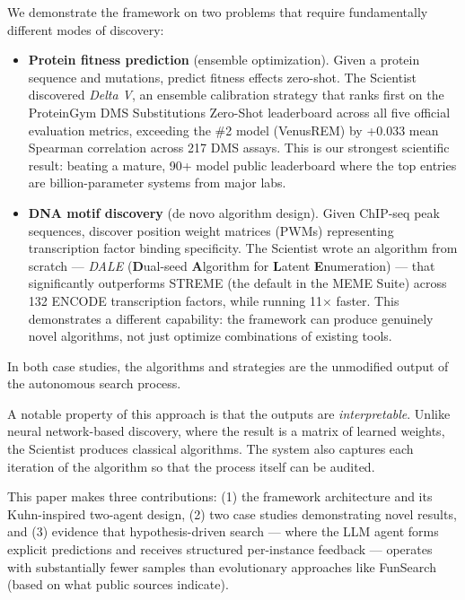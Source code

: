 \documentclass[11pt,a4paper]{article}
\begin{document}
We demonstrate the framework on two problems that require fundamentally different modes of discovery:

\begin{itemize}
    \item \textbf{Protein fitness prediction} (ensemble optimization). Given a protein sequence and mutations, predict fitness effects zero-shot. The Scientist discovered \emph{Delta V}, an ensemble calibration strategy that ranks first on the ProteinGym DMS Substitutions Zero-Shot leaderboard \citep{notin2023proteingym} across all five official evaluation metrics, exceeding the \#2 model (VenusREM) by +0.033 mean Spearman correlation across 217 DMS assays. This is our strongest scientific result: beating a mature, 90+ model public leaderboard where the top entries are billion-parameter systems from major labs.
    \item \textbf{DNA motif discovery} (de novo algorithm design). Given ChIP-seq peak sequences, discover position weight matrices (PWMs) representing transcription factor binding specificity. The Scientist wrote an algorithm from scratch --- \emph{DALE} (\textbf{D}ual-seed \textbf{A}lgorithm for \textbf{L}atent \textbf{E}numeration) --- that significantly outperforms STREME (the default in the MEME Suite) across 132 ENCODE transcription factors, while running 11$\times$ faster. This demonstrates a different capability: the framework can produce genuinely novel algorithms, not just optimize combinations of existing tools.
\end{itemize}

In both case studies, the algorithms and strategies are the unmodified output of the autonomous search process.

A notable property of this approach is that the outputs are \emph{interpretable}. Unlike neural network-based discovery, where the result is a matrix of learned weights, the Scientist produces classical algorithms. The system also captures each iteration of the algorithm so that the process itself can be audited.

This paper makes three contributions: (1) the framework architecture and its Kuhn-inspired two-agent design, (2) two case studies demonstrating novel results, and (3) evidence that hypothesis-driven search --- where the LLM agent forms explicit predictions and receives structured per-instance feedback --- operates with substantially fewer samples than evolutionary approaches like FunSearch (based on what public sources indicate).
\end{document}

